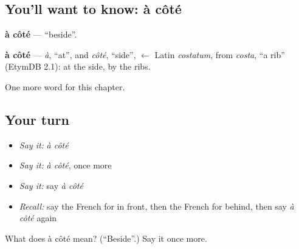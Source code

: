 \subsection*{You'll want to know: à côté}
\textbf{à côté} — \textquotedblleft{}beside\textquotedblright{}.

\begin{cousinweb}
\textbf{à côté} — \emph{à}, \textquotedblleft{}at\textquotedblright{}, and \emph{côté}, \textquotedblleft{}side\textquotedblright{}, $\leftarrow$ Latin \emph{costatum}, from \emph{costa}, \textquotedblleft{}a rib\textquotedblright{} (EtymDB 2.1): at the side, by the ribs.
\end{cousinweb}

\begin{grammarlens}[title={What you've built}]
One more word for this chapter.
\end{grammarlens}

\subsection*{Your turn}
\begin{itemize}
\raggedright
  \item \emph{Say it:} \emph{à côté}
  \item \emph{Say it:} \emph{à côté}, once more
  \item \emph{Say it:} say \emph{à côté}
  \item \emph{Recall:} say the French for in front, then the French for behind, then say \emph{à côté} again
\end{itemize}

\begin{tcolorbox}[breakable,colback=teal!4,colframe=teal!35!black,title={Before you move on}]
What does à côté mean? (\textquotedblleft{}Beside\textquotedblright{}.) Say it once more.
\end{tcolorbox}
